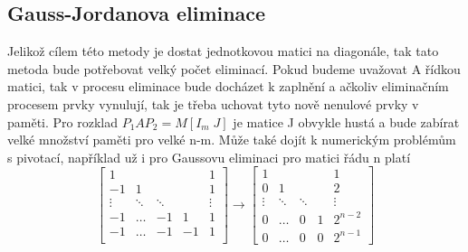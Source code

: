 \documentclass{article}
\theoremstyle{plain}
\theoremstyle{definition}
\begin{document}
\subsection{Gauss-Jordanova eliminace}
Jelikož cílem této metody je dostat jednotkovou matici na diagonále, tak tato metoda bude potřebovat velký počet eliminací.
Pokud budeme uvažovat A řídkou matici, tak v procesu eliminace bude docházet k zaplnění a ačkoliv eliminačním procesem prvky vynulují, tak je třeba uchovat tyto nově nenulové prvky v paměti.
Pro rozklad $P_1AP_2=M[I_m\; J]$ je matice J obvykle hustá a bude zabírat velké množství paměti pro velké n-m.
Může také dojít k numerickým problémům s pivotací, například už i pro Gaussovu eliminaci pro matici řádu n platí
\[\begin{bmatrix}
    1 & & & & 1 \\
    -1 & 1 & & & 1 \\
    \vdots & \ddots & \ddots &  & \vdots \\
    -1 & \hdots & -1 & 1 & 1 \\
    -1 & \hdots & -1 & -1 & 1 \\   
\end{bmatrix}
\longrightarrow
\begin{bmatrix}
    1 & & & & 1 \\
    0& 1 & & & 2 \\
    \vdots & \ddots & \ddots & & \vdots \\
    0 & \hdots & 0 & 1 & 2^{n-2} \\
    0 & \hdots & 0 & 0 & 2^{n-1}
\end{bmatrix}\]
\end{document}
